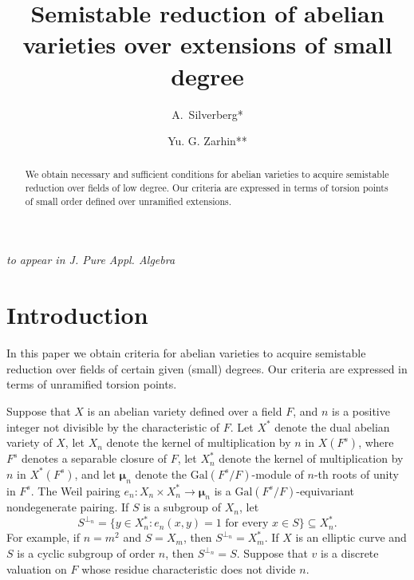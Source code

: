 \documentclass{amsart}
\title[Semistable reduction of abelian varieties]
{Semistable reduction of abelian varieties over extensions
of small degree}
\author[A.\ Silverberg]{A.\ Silverberg*}
\author[Yu. G. Zarhin]{Yu. G. Zarhin**}
\def\Gal{\mathrm{Gal}}
\def\bmu{\boldsymbol \mu}
\theoremstyle{definition}
\begin{document}
{\em to appear in J. Pure Appl. Algebra}

\begin{abstract}
We obtain necessary and sufficient conditions for abelian
varieties to acquire semistable reduction over fields of
low degree. Our criteria are expressed in terms of torsion
points of small order defined over unramified extensions.
\end{abstract}

\maketitle

\section{Introduction}

In this paper we obtain criteria for 
abelian varieties to acquire semistable reduction over fields
of certain given (small) degrees. Our criteria are expressed
in terms of unramified torsion points. 

Suppose that $X$ is an abelian variety defined over a field 
$F$, and $n$ is a positive integer not divisible by the characteristic
of $F$. Let $X^\ast$ denote the dual abelian variety of $X$, let
$X_n$ denote the kernel of multiplication by $n$ in $X(F^s)$, 
where $F^s$ denotes a separable closure of $F$, 
let
$X_n^\ast$ denote the kernel of multiplication by $n$ in $X^\ast(F^s)$,
and let $\bmu _n$ denote the $\Gal (F^s/F)$-module
of $n$-th roots of unity in $F^s$. 
The Weil pairing 
$e_n : X_n \times X_n^\ast \to {\bmu}_n$
is a $\Gal(F^s/F)$-equivariant nondegenerate pairing. 
If $S$ is a subgroup of $X_n$, let 
$$S^{\perp_n} = 
\{ y \in X_n^\ast : e_n(x,y) = 1 \text{ for every } x \in S \}
\subseteq X_n^\ast.$$
For example, if $n = m^2$ and $S = X_m$, then $S^{\perp_n} = X_m^\ast$.
If $X$ is an elliptic curve and $S$ is a cyclic subgroup of
order $n$, then $S^{\perp_n} = S$.
Suppose that $v$ is a discrete valuation on $F$ whose residue
characteristic does not divide $n$. 
\end{document}
